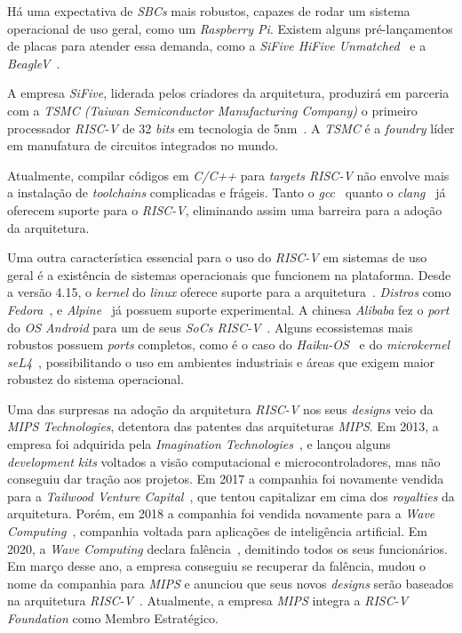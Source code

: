 { Há uma expectativa de \textit{SBCs} mais robustos, capazes de rodar um
    sistema operacional de uso geral, como um \textit{Raspberry Pi}. Existem
    alguns pré-lançamentos de placas para atender essa demanda, como a
    \textit{SiFive HiFive Unmatched}~\cite{hifive_unmatched} e a
    \textit{BeagleV}~\cite{beaglev}.
}

{ A empresa \textit{SiFive}, liderada pelos criadores da arquitetura, produzirá
    em parceria com a \textit{TSMC (Taiwan Semiconductor Manufacturing Company)}
    o primeiro processador \textit{RISC-V} de 32 \textit{bits} em tecnologia
    de 5nm~\cite{sifive_tsmc}. A \textit{TSMC} é a \textit{foundry} líder em
    manufatura de circuitos integrados no mundo.
}

{ Atualmente, compilar códigos em \textit{C/C++} para \textit{targets RISC-V}
    não envolve mais a instalação de \textit{toolchains} complicadas e frágeis.
    Tanto o \textit{gcc}~\cite{gcc_riscv} quanto o \textit{clang}~\cite{clang_riscv}
    já oferecem suporte para o \textit{RISC-V}, eliminando assim uma barreira
    para a adoção da arquitetura.
}

{ Uma outra característica essencial para o uso do \textit{RISC-V} em sistemas
    de uso geral é a existência de sistemas operacionais que funcionem na
    plataforma. Desde a versão 4.15, o \textit{kernel} do \textit{linux}
    oferece suporte para a arquitetura~\cite{linux_kernel}. \textit{Distros}
    como \textit{Fedora}~\cite{fedora_experimental},
    e \textit{Alpine}~\cite{alpine_experimental} já possuem suporte experimental.
    A chinesa \textit{Alibaba} fez o \textit{port} do \textit{OS Android}
    para um de seus \textit{SoCs RISC-V}~\cite{alibaba_android}. Alguns
    ecossistemas mais robustos possuem \textit{ports} completos, como é o
    caso do \textit{Haiku-OS}~\cite{haiku_riscv} e do \textit{microkernel
    seL4}~\cite{sel4_riscv}, possibilitando o uso em ambientes industriais
    e áreas que exigem maior robustez do sistema operacional.
}

{ Uma das surpresas na adoção da arquitetura \textit{RISC-V} nos seus
    \textit{designs} veio da \textit{MIPS Technologies}, detentora das
    patentes das arquiteturas \textit{MIPS}. Em 2013, a empresa foi adquirida
    pela \textit{Imagination Technologies}~\cite{imagination_technologies_acq},
    e lançou alguns \textit{development kits} voltados a visão computacional
    e microcontroladores, mas não conseguiu dar tração aos projetos.
    Em 2017 a companhia foi novamente vendida para a \textit{Tailwood
    Venture Capital}~\cite{tailwood_acq}, que tentou capitalizar em cima dos
    \textit{royalties} da arquitetura. Porém, em 2018 a companhia foi vendida
    novamente para a \textit{Wave Computing}~\cite{wave_comp_acq}, companhia
    voltada para aplicações de inteligência artificial. Em 2020, a
    \textit{Wave Computing} declara falência~\cite{wave_comp_bankrupt},
    demitindo todos os seus funcionários. Em março desse ano, a empresa
    conseguiu se recuperar da falência, mudou o nome da companhia para
    \textit{MIPS} e anunciou que seus novos \textit{designs} serão baseados
    na arquitetura \textit{RISC-V}~\cite{mips_reborn}. Atualmente, a empresa
    \textit{MIPS} integra a \textit{RISC-V Foundation} como Membro Estratégico.
}


